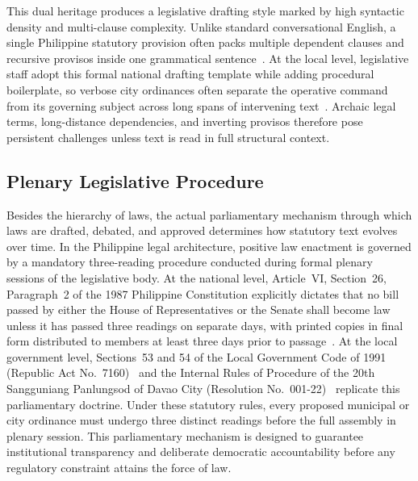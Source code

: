     This dual heritage produces a legislative drafting style marked by high syntactic density and multi-clause complexity. Unlike standard conversational English, a single Philippine statutory provision often packs multiple dependent clauses and recursive provisos inside one grammatical sentence~\cite{bernardo2023disambiguating}. At the local level, legislative staff adopt this formal national drafting template while adding procedural boilerplate, so verbose city ordinances often separate the operative command from its governing subject across long spans of intervening text~\cite{spdc2022ra00122}. Archaic legal terms, long-distance dependencies, and inverting provisos therefore pose persistent challenges unless text is read in full structural context.

    \subsection{Plenary Legislative Procedure}
    Besides the hierarchy of laws, the actual parliamentary mechanism through which laws are drafted, debated, and approved determines how statutory text evolves over time. In the Philippine legal architecture, positive law enactment is governed by a mandatory three-reading procedure conducted during formal plenary sessions of the legislative body. At the national level, Article~VI, Section~26, Paragraph~2 of the 1987 Philippine Constitution explicitly dictates that no bill passed by either the House of Representatives or the Senate shall become law unless it has passed three readings on separate days, with printed copies in final form distributed to members at least three days prior to passage~\cite{philconst1987, philhouse2022rules}. At the local government level, Sections~53 and 54 of the Local Government Code of 1991 (Republic Act No.~7160)~\cite{philgov1991ra7160} and the Internal Rules of Procedure of the 20th Sangguniang Panlungsod of Davao City (Resolution No.~001-22)~\cite{spdc2022ra00122} replicate this parliamentary doctrine. Under these statutory rules, every proposed municipal or city ordinance must undergo three distinct readings before the full assembly in plenary session. This parliamentary mechanism is designed to guarantee institutional transparency and deliberate democratic accountability before any regulatory constraint attains the force of law.

